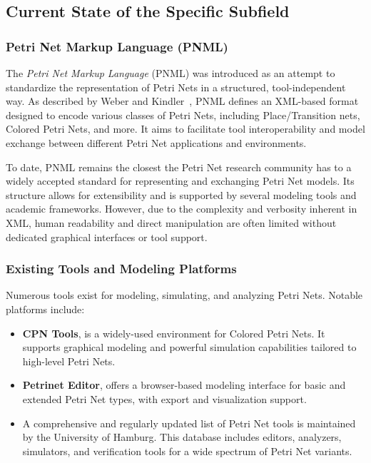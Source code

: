 \documentclass[12pt]{article}
\begin{document}
    \subsection{Current State of the Specific Subfield}

        \subsubsection{Petri Net Markup Language (PNML)}

        The \textit{Petri Net Markup Language} (PNML) was introduced as an attempt to standardize the representation of Petri Nets in a structured, tool-independent way. As described by Weber and Kindler~\cite{weber2003petri}, PNML defines an XML-based format designed to encode various classes of Petri Nets, including Place/Transition nets, Colored Petri Nets, and more. It aims to facilitate tool interoperability and model exchange between different Petri Net applications and environments.

        To date, PNML remains the closest the Petri Net research community has to a widely accepted standard for representing and exchanging Petri Net models. Its structure allows for extensibility and is supported by several modeling tools and academic frameworks. However, due to the complexity and verbosity inherent in XML, human readability and direct manipulation are often limited without dedicated graphical interfaces or tool support.

        \subsubsection{Existing Tools and Modeling Platforms}

        Numerous tools exist for modeling, simulating, and analyzing Petri Nets. Notable platforms include:

        \begin{itemize}
            \item \textbf{CPN Tools}\cite{verbeek2021cpn}, is a widely-used environment for Colored Petri Nets. It supports graphical modeling and powerful simulation capabilities tailored to high-level Petri Nets.
            \item \textbf{Petrinet Editor}\cite{app10217662}, offers a browser-based modeling interface for basic and extended Petri Net types, with export and visualization support.
            \item A comprehensive and regularly updated list of Petri Net tools is maintained by the University of Hamburg\cite{tgi_petri_tools}. This database includes editors, analyzers, simulators, and verification tools for a wide spectrum of Petri Net variants.
        \end{itemize}
\end{document}
